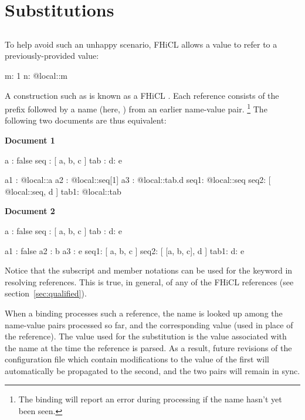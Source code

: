\documentclass[draftmode,draftwater]{memarticle}
\makeatletter
\newcommand{\fhicl}{FHiCL\xspace}
\newcommand{\atlocal}{\fclcode{@local::}\xspace}
\makeatother
\begin{document}
\section{Substitutions}

\subsection{\atlocal}

To help avoid such an unhappy scenario, \fhicl allows a value to refer
to a previously-provided value:
%
\Needspace{0.34in}
\begin{fcllisting}[texcl,escapechar=`]
m: 1
n: @local::m
\end{fcllisting}
%
A construction such as  is known as a \fhicl
{}.  Each reference consists of the prefix \atlocal
followed by a name (here, ) from an earlier name-value
pair.%
\footnote{%
  The binding will report an error during processing if the name
  hasn't yet been seen.%
}
The following two documents are thus equivalent:

\begin{minipage}{0.48\textwidth}
\centering\textbf{Document 1}
  \begin{fcllisting}[texcl,escapechar=`]
a   : false
seq : [ a, b, c ]
tab : { d: e }

a1  : @local::a
a2  : @local::seq[1]
a3  : @local::tab.d
seq1: @local::seq
seq2: [ @local::seq, d ]
tab1: @local::tab
  \end{fcllisting}
\end{minipage}\hfill
\begin{minipage}{0.48\textwidth}
\centering\textbf{Document 2}
  \begin{fcllisting}[texcl,escapechar=`]
a   : false
seq : [ a, b, c ]
tab : { d: e }

a1  : false
a2  : b
a3  : e
seq1: [ a, b, c ]
seq2: [ [a, b, c], d ]
tab1: { d: e }
  \end{fcllisting}
\end{minipage}

\noindent Notice that the subscript and member notations can be used
for the \atlocal keyword in resolving references.  This is true, in
general, of any of the FHiCL references (see
section~\ref{sec:qualified}).

When a binding processes such a reference, the name is looked up among
the name-value pairs processed so far, and the corresponding value
 (used in place of the reference).  The value used
for the substitution is the value associated with the name at the time
the reference is parsed.  As a result, future revisions of the
configuration file which contain modifications to the value of the
first will automatically be propagated to the second, and the two
pairs will remain in sync.
\end{document}
